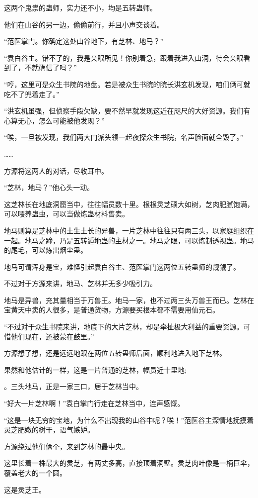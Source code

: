 \begin{this_body}
这两个鬼祟的蛊师，实力还不小，均是五转蛊师。

他们在山谷的另一边，偷偷前行，并且小声交谈着。

“范医掌门。你确定这处山谷地下，有芝林、地马？”

“袁白谷主。错不了的，我是亲眼所见！你别着急，跟着我进入山洞，待会亲眼看到了，不就确信了吗？”

“哼，这里可是众生书院的地盘。若是被众生书院的院长洪玄机发现，咱们俩可就吃不了兜着走了。”

“洪玄机虽强，但侦察手段欠缺，要不然早就发现这近在咫尺的大好资源。我们有心算无心，怎么可能被他发现？”

“唉，一旦被发现，我们两大门派头领一起夜探众生书院，名声脸面就全毁了。”

……

方源将这两人的对话，尽收耳中。

“芝林，地马？”他心头一动。

这芝林长在地底洞窟当中，往往幅员数十里。根根灵芝硕大如树，芝肉肥腻饱满，可以喂养蛊虫，可以当做炼蛊材料售卖。

地马则算是芝林中的土生土长的异兽，一片芝林中往往只有两三头，以家庭组织在一起。地马之蹄，乃是五转遁地蛊的主材之一。地马之眼，可以炼制透视蛊。地马的尾毛，可以炼出烟尘蛊。

地马可谓浑身是宝，难怪引起袁白谷主、范医掌门这两位五转蛊师的觊觎了。

不过对于方源来讲，地马、芝林并无多少吸引力。

地马是异兽，充其量相当于万兽王。地马一家，也不过两三头万兽王而已。芝林在宝黄天中卖的人很多，是普通货物，方源要买根本都不需要用仙元石。

“不过对于众生书院来讲，地底下的大片芝林，却是牵扯极大利益的重要资源。可惜他们现在，还被蒙在鼓里。”

方源想了想，还是远远地跟在两位五转蛊师后面，顺利地进入地下芝林。

果然和他估计的一样，这是一片普通的芝林，幅员近十里地;

。三头地马，正是一家三口，居于芝林当中。

“好大一片芝林啊！”袁白掌门行走在芝林当中，连声感慨。

“这是一块无穷的宝地，为什么不出现我的山谷中呢？唉！”范医谷主深情地抚摸着灵芝肥嫩的树干，语气嫉妒。

方源绕过他们俩个，来到芝林的最中央。

这里长着一株最大的灵芝，有两丈多高，直接顶着洞壁。灵芝肉叶像是一柄巨伞，覆盖老大的一个圆。

这是灵芝王。


\end{this_body}
